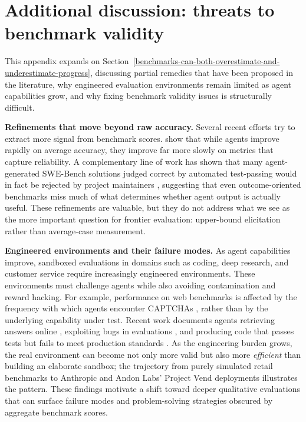 \documentclass{article}
\begin{document}


\newpage
\appendix

\section{Additional discussion: threats to benchmark validity}\label{app:benchmark-validity}

This appendix expands on Section~\ref{benchmarks-can-both-overestimate-and-underestimate-progress}, discussing partial remedies that have been proposed in the literature, why engineered evaluation environments remain limited as agent capabilities grow, and why fixing benchmark validity issues is structurally difficult.

\textbf{Refinements that move beyond raw accuracy.} Several recent efforts try to extract more signal from benchmark scores. \citet{arxivabs260216666} show that while agents improve rapidly on average accuracy, they improve far more slowly on metrics that capture reliability. A complementary line of work has shown that many agent-generated SWE-Bench solutions judged correct by automated test-passing would in fact be rejected by project maintainers \citep{metrOrgNotes2026}, suggesting that even outcome-oriented benchmarks miss much of what determines whether agent output is actually useful. These refinements are valuable, but they do not address what we see as the more important question for frontier evaluation: upper-bound elicitation rather than average-case measurement.

\textbf{Engineered environments and their failure modes.} As agent capabilities improve, sandboxed evaluations in domains such as coding, deep research, and customer service require increasingly engineered environments. These environments must challenge agents while also avoiding contamination and reward hacking. For example, performance on web benchmarks is affected by the frequency with which agents encounter CAPTCHAs \citep{arxivpdf251002418}, rather than by the underlying capability under test. Recent work documents agents retrieving answers online \citep{nistGovCaisiCheating}, exploiting bugs in evaluations \citep{githubComIssues465}, and producing code that passes tests but fails to meet production standards \citep{metrOrgNotes2026}. As the engineering burden grows, the real environment can become not only more valid but also more \emph{efficient} than building an elaborate sandbox; the trajectory from purely simulated retail benchmarks to Anthropic and Andon Labs' Project Vend deployments \citep{anthropicComResearchProject,anthropicComResearchProject2,andonlabsComBlogAndon} illustrates the pattern. These findings motivate a shift toward deeper qualitative evaluations that can surface failure modes and problem-solving strategies obscured by aggregate benchmark scores.
\end{document}
